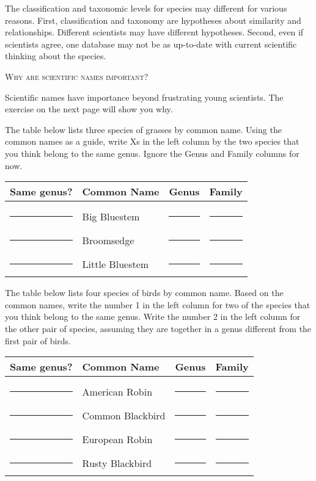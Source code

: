 \documentclass[11pt]{exam}
\begin{document}
\begin{questions}
The classification and taxonomic levels for species may different for various reasons. First, classification and taxonomy are hypotheses about similarity and relationships. Different scientists may have different hypotheses. Second, even if scientists agree, one database may not be as up-to-date with current scientific thinking about the species.

\bigskip
W\textsc{hy are scientific names important?}

\bigskip

Scientific names have importance beyond frustrating young scientists. The exercise on the next page will show you why.

\question
The table below lists three species of grasses by common name. Using the common names as a guide, write Xs in the left column by the two species that you think belong to the same genus. Ignore the Genus and Family columns for now.

\begin{tabular}{@{}L{0.4in}L{1.2in}C{1.1in}C{1.1in}@{}}
\toprule
Same genus?	& Common Name	& Genus & Family \tabularnewline
\midrule
&&&\tabularnewline
\rule{0.29in}{0.4pt}	& Big Bluestem &\rule{1in}{0.4pt} & \rule{1in}{0.4pt} \tabularnewline[3ex]
\rule{0.29in}{0.4pt}	& Broomsedge & \rule{1in}{0.4pt} & \rule{1in}{0.4pt} \tabularnewline[3ex]
\rule{0.29in}{0.4pt}	& Little Bluestem & \rule{1in}{0.4pt} & \rule{1in}{0.4pt} \tabularnewline
\bottomrule
\end{tabular}

\bigskip

\question
The table below lists four species of birds by common name. Based on the common names, write the number 1 in the left column for two of the species that you think belong to the same genus. Write the number 2 in the left column for the other pair of species, assuming they are together in a genus different from the first pair of birds. 

\begin{tabular}{@{}L{0.4in}L{1.2in}C{1.1in}C{1.1in}@{}}
\toprule
Same genus?	& Common Name	& Genus & Family \tabularnewline
\midrule
&&&\tabularnewline
\rule{0.29in}{0.4pt}	& American Robin &\rule{1in}{0.4pt} & \rule{1in}{0.4pt} \tabularnewline[3ex]
\rule{0.29in}{0.4pt}	& Common Blackbird & \rule{1in}{0.4pt} & \rule{1in}{0.4pt} \tabularnewline[3ex]
\rule{0.29in}{0.4pt}	& European Robin & \rule{1in}{0.4pt} & \rule{1in}{0.4pt} \tabularnewline[3ex]
\rule{0.29in}{0.4pt}	& Rusty Blackbird & \rule{1in}{0.4pt} & \rule{1in}{0.4pt} \tabularnewline
\bottomrule
\end{tabular}


\end{questions}
\end{document}

